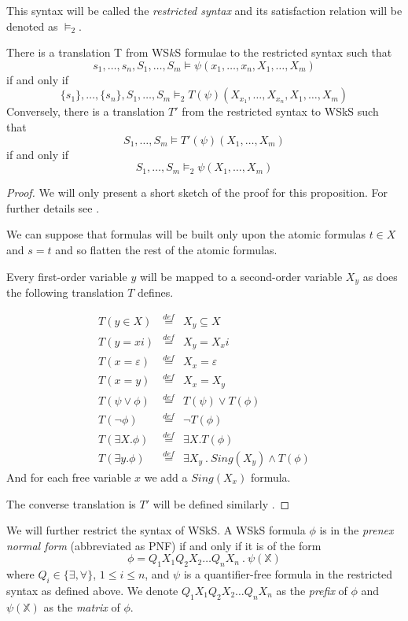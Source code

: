 	This syntax will be called the \emph{restricted syntax} and its satisfaction relation will be denoted as $\vDash_2$.
	
	\begin{prop}
	There is a translation T from WS$k$S formulae to the restricted syntax such that $$s_1,\ldots,s_n,S_1,\ldots,S_m \vDash \psi(x_1,\ldots,x_n,X_1,\ldots,X_m)$$ if and only if $$\{s_1\},\ldots,\{s_n\},S_1,\ldots,S_m \vDash_2 T(\psi)(X_{x_1},\ldots,X_{x_n}, X_1,\ldots,X_m)$$ Conversely, there is a translation $T'$ from the restricted syntax to WSkS such that $$S_1,\ldots,S_m \vDash T'(\psi)(X_1,\ldots,X_m)$$ if and only if $$S_1,\ldots,S_m \vDash_2 \psi(X_1,\ldots,X_m)$$
	\end{prop}
	\begin{proof}
	We will only present a short sketch of the proof for this proposition. For further details see \cite{tata}.
	
	We can suppose that formulas will be built only upon the atomic formulas $t \in X$ and $s = t$ and so flatten the rest of the atomic formulas.
	
	Every first-order variable $y$ will be mapped to a second-order variable $X_y$ as does the following translation $T$ defines.
	
	 \begin{eqnarray*}
	 T(y \in X) & \overset{def}{=} & X_y \subseteq X\\
	 T(y = xi) & \overset{def}{=} &  X_y = X_xi\\
	 T(x = \varepsilon) & \overset{def}{=} & X_x = \varepsilon\\
	 T(x = y) & \overset{def}{=} & X_x = X_y\\
	 T(\psi \vee \phi) & \overset{def}{=} & T(\psi) \vee T(\phi)\\
	 T(\neg\phi) & \overset{def}{=} & \neg T(\phi)\\
	 T(\exists X.\phi) & \overset{def}{=} & \exists X.T(\phi)\\
	 T(\exists y.\phi) & \overset{def}{=} & \exists X_y\ .\ Sing(X_y) \wedge T(\phi)
	 \end{eqnarray*}
	And for each free variable $x$ we add a $Sing(X_x)$ formula. 
	
	The converse translation is $T'$ will be defined similarly \cite{tata}.
	\end{proof}
	
	We will further restrict the syntax of WSkS. A WSkS formula $\phi$ is in the \emph{prenex normal form} (abbreviated as PNF) if and only if it is of the form $$\phi = Q_1X_1Q_2X_2\ldots Q_nX_n\ .\ \psi(\mathds{X})$$ where  $Q_i \in \{\exists,\forall\}$, $1 \leq i \leq n$, and $\psi$ is a quantifier-free formula in the restricted syntax as defined above. We denote $Q_1X_1Q_2X_2\ldots Q_nX_n$ as the \emph{prefix} of $\phi$ and $\psi(\mathds{X})$ as the \emph{matrix} of $\phi$.
	
